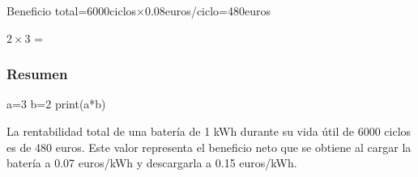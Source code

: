 \documentclass[a4paper,12pt]{article}
\begin{document}
\begin{Form}
Beneficio total=6000ciclos×0.08euros/ciclo=480euros

$2 \times 3$ = 

\subsubsection*{Resumen}

a=3
b=2
print(a*b)


La rentabilidad total de una batería de 1 kWh durante su vida útil de 6000 ciclos es de 480 euros. Este valor representa el beneficio neto que se obtiene al cargar la batería a 0.07 euros/kWh y descargarla a 0.15 euros/kWh.





\end{Form}
\end{document}
